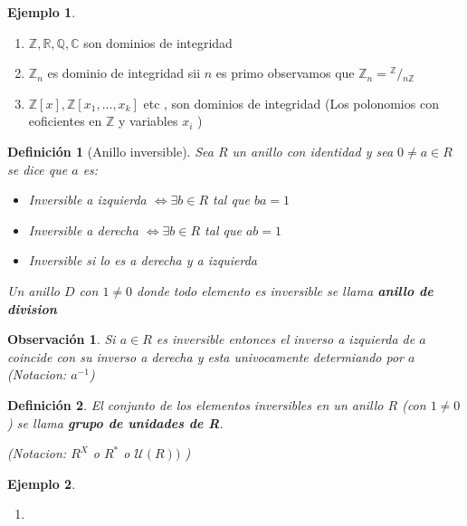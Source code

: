 \documentclass[10pt]{extarticle}
\theoremstyle{break}
\newtheorem*{remark}{Observación}
\newtheorem{definition}{Definición}[section]
\theoremstyle{definition}
\newtheorem{example}{Ejemplo}[section]
\newcommand\quotient[2]{{^{\displaystyle #1}}/{_{\displaystyle #2}}}
\begin{document}
\begin{example}
	\begin{enumerate}
		\item $\mathbb{Z},\mathbb{R},\mathbb{Q},\mathbb{C} $ son dominios de integridad
		\item $\mathbb{Z}_{n}$ es dominio de integridad sii $n$ es primo observamos que $\mathbb{Z}_{n}=\quotient{\mathbb{Z} }{n\mathbb{Z} }$ 
		\item $\mathbb{Z}[x],\mathbb{Z} [x_{1},\ldots,x_{k}]$ etc , son dominios de integridad (Los polonomios con eoficientes en $\mathbb{Z} $ y variables $x_{i}$ ) 
	\end{enumerate}
\end{example}

\begin{definition}[Anillo inversible]
	Sea $R$ un anillo con identidad y sea $0\neq a\in R$ se dice que $a$ es:
	\begin{itemize}
		\item Inversible a izquierda $\iff\exists b\in R$ tal que $ba=1$    
		\item Inversible a derecha $\iff\exists b\in R$ tal que $ab=1$
		\item Inversible si lo es a derecha y a izquierda
	\end{itemize}

	Un anillo $D$ con $1\neq 0$ donde todo elemento es inversible se llama \textbf{anillo de division} 
\end{definition}

\begin{remark}
	Si $a\in R$ es inversible entonces el inverso a izquierda de $a$ coincide con su inverso a derecha y esta univocamente determiando por $a$ (Notacion: $a^{-1}$)  
\end{remark}

\begin{definition}
	El conjunto de los elementos inversibles en un anillo $R$ (con $1\neq 0$ ) se llama \textbf{grupo de unidades de R}. 

	(Notacion: $R^{X}$ o $R^{*}$ o $\mathcal{U}(R))$   )
\end{definition}

\begin{example}
	\begin{enumerate}
		\item 
	\end{enumerate}
\end{example}
\end{document}

